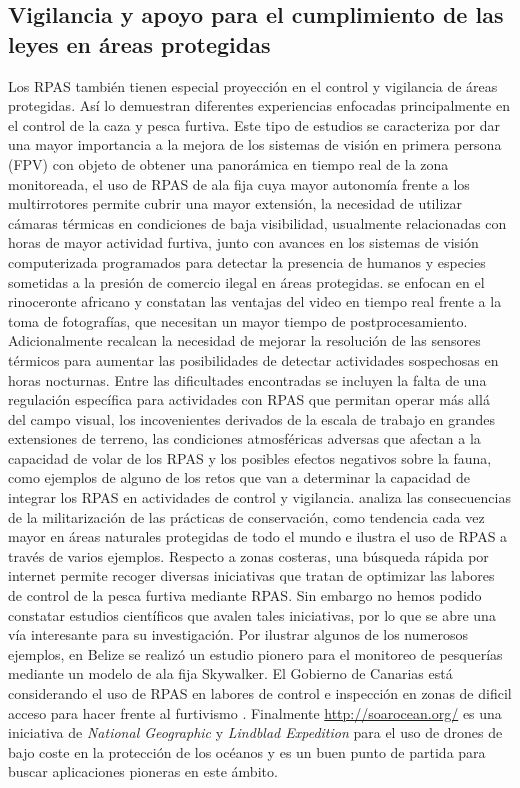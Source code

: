 \documentclass[onecolumn]{extarticle}
\begin{document}
\subsection{Vigilancia y apoyo para el cumplimiento de las leyes en
áreas
protegidas}\label{vigilancia-y-apoyo-para-el-cumplimiento-de-las-leyes-en-areas-protegidas}

Los RPAS también tienen especial proyección en el control y vigilancia
de áreas protegidas. Así lo demuestran diferentes experiencias enfocadas
principalmente en el control de la caza y pesca furtiva. Este tipo de
estudios se caracteriza por dar una mayor importancia a la mejora de los
sistemas de visión en primera persona (FPV) con objeto de obtener una
panorámica en tiempo real de la zona monitoreada, el uso de RPAS de ala
fija cuya mayor autonomía frente a los multirrotores permite cubrir una
mayor extensión, la necesidad de utilizar cámaras térmicas en
condiciones de baja visibilidad, usualmente relacionadas con horas de
mayor actividad furtiva, junto con avances en los sistemas de visión
computerizada programados para detectar la presencia de humanos y
especies sometidas a la presión de comercio ilegal en áreas protegidas.
\citep{Mulero-Pazmany2014} se enfocan en el rinoceronte africano y
constatan las ventajas del video en tiempo real frente a la toma de
fotografías, que necesitan un mayor tiempo de postprocesamiento.
Adicionalmente recalcan la necesidad de mejorar la resolución de las
sensores térmicos para aumentar las posibilidades de detectar
actividades sospechosas en horas nocturnas. Entre las dificultades
encontradas se incluyen la falta de una regulación específica para
actividades con RPAS que permitan operar más allá del campo visual, los
incovenientes derivados de la escala de trabajo en grandes extensiones
de terreno, las condiciones atmosféricas adversas que afectan a la
capacidad de volar de los RPAS y los posibles efectos negativos sobre la
fauna, como ejemplos de alguno de los retos que van a determinar la
capacidad de integrar los RPAS en actividades de control y vigilancia.
\citep{Duffy2014} analiza las consecuencias de la militarización de las
prácticas de conservación, como tendencia cada vez mayor en áreas
naturales protegidas de todo el mundo e ilustra el uso de RPAS a través
de varios ejemplos. Respecto a zonas costeras, una búsqueda rápida por
internet permite recoger diversas iniciativas que tratan de optimizar
las labores de control de la pesca furtiva mediante RPAS. Sin embargo no
hemos podido constatar estudios científicos que avalen tales
iniciativas, por lo que se abre una vía interesante para su
investigación. Por ilustrar algunos de los numerosos ejemplos, en Belize
se realizó un estudio pionero para el monitoreo de pesquerías mediante
un modelo de ala fija Skywalker. El Gobierno de Canarias está
considerando el uso de RPAS en labores de control e inspección en zonas
de dificil acceso para hacer frente al furtivismo \citep{Canarias2017} .
Finalmente \url{http://soarocean.org/} es una iniciativa de
\emph{National Geographic} y \emph{Lindblad Expedition} para el uso de
drones de bajo coste en la protección de los océanos y es un buen punto
de partida para buscar aplicaciones pioneras en este ámbito.
\end{document}
